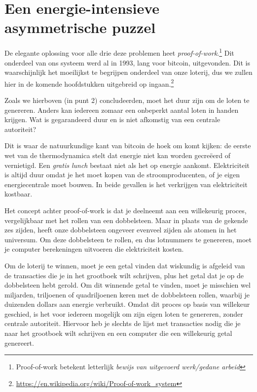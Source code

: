\section[Energie-intensieve asymmetrische puzzel]{Een energie-intensieve asymmetrische puzzel}

De elegante oplossing voor alle drie deze problemen heet \textit{proof-of-work}.\footnote{ Proof-of-work betekent letterlijk \textit{bewijs van uitgevoerd werk/gedane arbeid}} Dit onderdeel van ons systeem werd al in 1993, lang voor bitcoin, uitgevonden. Dit is waarschijnlijk het moeilijkst te begrijpen onderdeel van onze loterij, dus we zullen hier in de komende hoofdstukken uitgebreid op ingaan.\footnote{\href{https://en.wikipedia.org/wiki/Proof-of-work\_system}{https://en.wikipedia.org/wiki/Proof-of-work\_system}} 

Zoals we hierboven (in punt 2) concludeerden, moet het duur zijn om de loten te genereren. Anders kan iedereen zomaar een onbeperkt aantal loten in handen krijgen. Wat is gegarandeerd duur en is niet afkomstig van een centrale autoriteit?

Dit is waar de natuurkundige kant van bitcoin de hoek om komt kijken: de eerste wet van de thermodynamica stelt dat energie niet kan worden gecreëerd of vernietigd. Een \textit{gratis lunch} bestaat niet als het op energie aankomt. Elektriciteit is altijd duur omdat je het moet kopen van de stroomproducenten, of je eigen energiecentrale moet bouwen. In beide gevallen is het verkrijgen van elektriciteit kostbaar.

Het concept achter proof-of-work is dat je deelneemt aan een willekeurig proces, vergelijkbaar met het rollen van een dobbelsteen. Maar in plaats van de gekende zes zijden, heeft onze dobbelsteen ongeveer evenveel zijden als atomen in het universum. Om deze dobbelsteen te rollen, en dus lotnummers te genereren, moet je computer berekeningen uitvoeren die elektriciteit kosten.

Om de loterij te winnen, moet je een getal vinden dat wiskundig is afgeleid van de transacties die je in het grootboek wilt schrijven, plus het getal dat je op de dobbelsteen hebt gerold. Om dit winnende getal te vinden, moet je misschien wel miljarden, triljoenen of quadriljoenen keren met de dobbelsteen rollen, waarbij je duizenden dollars aan energie verbruikt. Omdat dit proces op basis van willekeur geschied, is het voor iedereen mogelijk om zijn eigen loten te genereren, zonder centrale autoriteit. Hiervoor heb je slechts de lijst met transacties nodig die je naar het grootboek wilt schrijven en een computer die een willekeurig getal genereert. 

